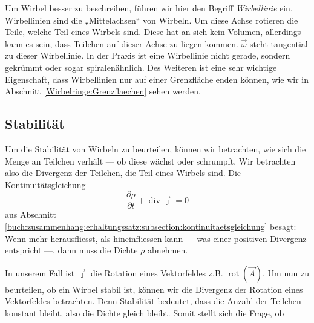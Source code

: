 Um Wirbel besser zu beschreiben, führen wir hier den Begriff {\em Wirbellinie} ein.
Wirbellinien sind die „Mittelachsen“ von Wirbeln. 
Um diese Achse rotieren die Teile, welche Teil eines Wirbels sind. 
Diese hat an sich kein Volumen, allerdings kann es sein, dass Teilchen auf dieser Achse zu liegen kommen. 
\(\vec{\omega}\) steht tangential zu dieser Wirbellinie.  
In der Praxis ist eine Wirbellinie nicht gerade, sondern gekrümmt oder sogar spiralenähnlich. 
Des Weiteren ist eine sehr wichtige Eigenschaft, dass Wirbellinien nur auf einer Grenzfläche enden können, 
wie wir in Abschnitt \ref{Wirbelringe:Grenzflaechen} sehen werden.

\subsection{Stabilität}

Um die Stabilität von Wirbeln zu beurteilen, können wir betrachten, wie sich die Menge an Teilchen verhält --- ob diese wächst oder schrumpft. 
Wir betrachten also die Divergenz der Teilchen, die Teil eines Wirbels sind.
Die Kontinuitätsgleichung 
\[
\frac{\partial \rho}{\partial t}
+
\operatorname{div}\vec{\jmath}
=
0
\]
aus Abschnitt \ref{buch:zusammenhang:erhaltungssatz:subsection:kontinuitaetsgleichung} besagt: Wenn mehr herausfliesst, als hineinfliessen kann --- was einer positiven Divergenz entspricht ---, dann muss die Dichte \(\rho\) abnehmen.

In unserem Fall ist \(\vec{\jmath}\) die Rotation eines Vektorfeldes z.B. \(\operatorname{rot}(\vec{A})\).
Um nun zu beurteilen, ob ein Wirbel stabil ist, können wir die Divergenz der Rotation eines Vektorfeldes betrachten.
Denn Stabilität bedeutet, dass die Anzahl der Teilchen konstant bleibt, also die Dichte gleich bleibt.
Somit stellt sich die Frage, ob

